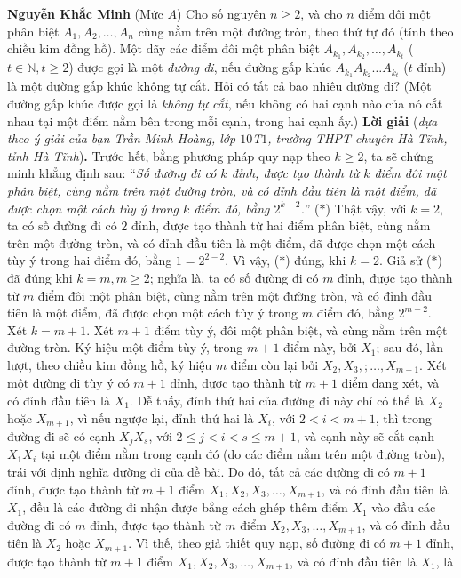 \begin{multicols}{2}
	\vskip 0.2cm
	\hfill\textbf{\color{thachthuctoanhoc}Nguyễn Khắc Minh}
	\vskip 0.2cm
	{}
	(Mức $A$) Cho số nguyên $n \ge 2$, và cho $n$ điểm đôi một phân biệt  $A_1, A_2, \ldots, A_n$   cùng nằm trên một đường tròn, theo thứ tự đó (tính theo chiều kim đồng hồ). Một dãy các điểm đôi một phân biệt  $A_{k_1}, A_{k_2}, \ldots, A_{k_t}$ ($t \in \mathbb{N}, t \ge 2$) được gọi là một \textit{đường đi}, nếu đường gấp khúc $A_{k_1}A_{k_2}\ldots A_{k_t}$ ($t$ đỉnh) là một đường gấp khúc không tự cắt. Hỏi có tất cả bao nhiêu đường đi?
	\vskip 0.05cm
	(Một đường gấp khúc được gọi là \textit{không tự cắt}, nếu không có hai cạnh nào của nó cắt nhau tại một điểm nằm bên trong mỗi cạnh, trong hai cạnh ấy.)
	\vskip 0.05cm
	\textbf{\color{thachthuctoanhoc}Lời giải} (\textit{dựa theo ý giải của bạn Trần Minh Hoàng, lớp $10$T$1$, trường THPT chuyên Hà Tĩnh, tỉnh Hà Tĩnh})\textbf{\color{thachthuctoanhoc}.}
	\vskip 0.05cm
	Trước hết, bằng phương pháp quy nạp theo $k \ge 2$, ta sẽ chứng minh khẳng định sau:
	\vskip 0.05cm
	“\textit{Số đường đi có $k$ đỉnh, được tạo thành từ $k$ điểm đôi một phân biệt, cùng nằm trên một đường tròn, và có đỉnh đầu tiên là một điểm, đã được chọn một cách tùy ý trong $k$ điểm đó, bằng $2^{k-2}$.}”                  \hfill ($*$)
	\vskip 0.05cm
	Thật vậy, với $k = 2$, ta có số đường đi có $2$ đỉnh, được tạo thành từ hai điểm phân biệt, cùng nằm trên một đường tròn, và có đỉnh đầu tiên là một điểm, đã được chọn một cách tùy ý trong hai điểm đó, bằng $1 = 2^{2-2}$. Vì vậy, ($*$) đúng, khi $k = 2$.
	\vskip 0.05cm 
	Giả sử ($*$) đã đúng khi $k = m, m \ge 2$; nghĩa là, ta có số đường đi có $m$ đỉnh, được tạo thành từ $m$ điểm đôi một phân biệt, cùng nằm trên một đường tròn, và có đỉnh đầu tiên là một điểm, đã được chọn một cách tùy ý trong $m$ điểm đó, bằng $2^{m-2}$.
	\vskip 0.05cm 
	Xét $k = m + 1$.
	\vskip 0.05cm
	Xét $m + 1$ điểm tùy ý, đôi một phân biệt, và cùng nằm trên một đường tròn. Ký hiệu một điểm tùy ý, trong $m + 1$ điểm này, bởi $X_1$; sau đó, lần lượt, theo chiều kim đồng hồ, ký hiệu $m$ điểm còn lại bởi $X_2, X_3, ;\ldots, X_{m+1}$.
	\vskip 0.05cm  
	Xét một đường đi tùy ý có $m + 1$ đỉnh, được tạo thành từ $m + 1$ điểm đang xét, và có đỉnh đầu tiên là $X_1$. Dễ thấy, đỉnh thứ hai của đường đi này chỉ có thể là $X_2$  hoặc $X_{m+1}$, vì nếu ngược lại, đỉnh thứ hai là $X_i$, với $2 < i < m + 1$, thì trong đường đi sẽ có cạnh $X_jX_s$, với $2 \le j < i < s \le m + 1$, và cạnh này sẽ cắt cạnh  $X_1X_i$ tại một điểm nằm trong cạnh đó (do các điểm nằm trên một đường tròn), trái với định nghĩa đường đi của đề bài. Do đó, tất cả các đường đi có $m + 1$ đỉnh, được tạo thành từ $m + 1$ điểm $X_1, X_2, X_3, \ldots,X_{m+1}$, và có đỉnh đầu tiên là $X_1$, đều là các đường đi nhận được bằng cách ghép thêm điểm $X_1$ vào đầu các đường đi có $m$ đỉnh, được tạo thành từ $m$ điểm  $X_2, X_3, \ldots, X_{m+1}$, và có đỉnh đầu tiên là $X_2$  hoặc $X_{m+1}$. Vì thế, theo giả thiết quy nạp, số đường đi có $m + 1$ đỉnh, được tạo thành từ $m + 1$ điểm  $X_1, X_2, X_3, \ldots, X_{m+1}$, và có đỉnh đầu tiên là $X_1$, là

\end{multicols}
